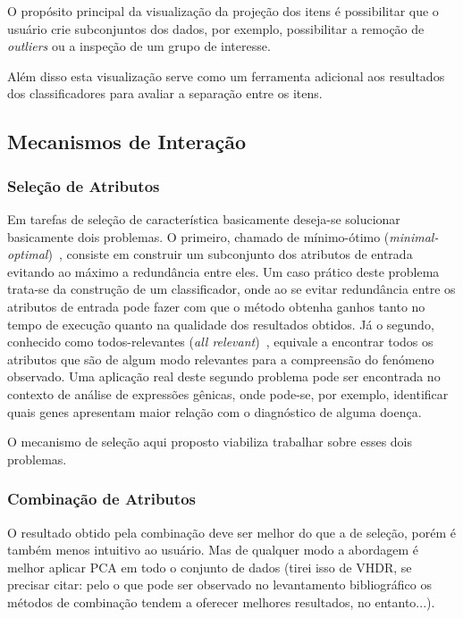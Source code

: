 O propósito principal da visualização da projeção dos itens é possibilitar que o usuário crie subconjuntos dos dados, por exemplo, possibilitar a remoção de \emph{outliers} ou a inspeção de um grupo de interesse.

Além disso esta visualização serve como um ferramenta adicional aos resultados dos classificadores para avaliar a separação entre os itens.


\subsection{Mecanismos de Interação}

\subsubsection{Seleção de Atributos}

Em tarefas de seleção de característica basicamente deseja-se solucionar basicamente dois problemas. 
O primeiro, chamado de mínimo-ótimo (\emph{minimal-optimal})~\cite{Kohavi1997}, consiste em construir um subconjunto dos atributos de entrada evitando ao máximo a redundância entre eles. 
Um caso prático deste problema trata-se da construção de um classificador, onde ao se evitar redundância entre os atributos de entrada pode fazer com que o método obtenha ganhos tanto no tempo de execução quanto na qualidade dos resultados obtidos. 
Já o segundo, conhecido como todos-relevantes (\emph{all relevant})~\cite{Nilsson2007}, equivale a encontrar todos os atributos que são de algum modo relevantes para a compreensão do fenómeno observado. 
Uma aplicação real deste segundo problema pode ser encontrada no contexto de análise de expressões gênicas, onde pode-se, por exemplo, identificar quais genes apresentam maior relação com o diagnóstico de alguma doença. 

O mecanismo de seleção aqui proposto viabiliza trabalhar sobre esses dois problemas.

\subsubsection{Combinação de Atributos}

O resultado obtido pela combinação deve ser melhor do que a de seleção, porém é também menos intuitivo ao usuário. Mas de qualquer modo a abordagem é melhor aplicar PCA em todo o conjunto de dados (tirei isso de VHDR, se precisar citar: pelo o que pode ser observado no levantamento bibliográfico os métodos de combinação tendem a oferecer melhores resultados, no entanto...).  

